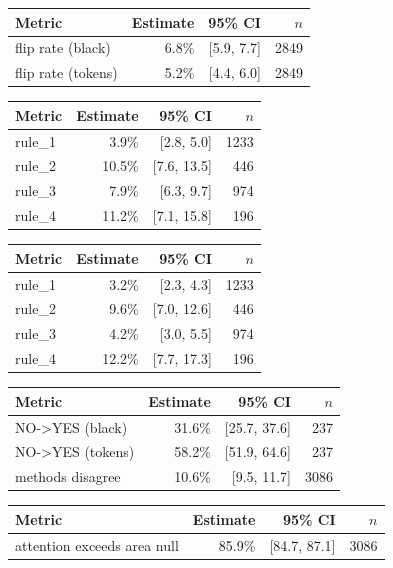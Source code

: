 \begin{tabular}{lrrr}
\toprule
Metric & Estimate & 95\% CI & $n$ \\
\midrule
flip rate (black) & 6.8\% & [5.9, 7.7] & 2849 \\
flip rate (tokens) & 5.2\% & [4.4, 6.0] & 2849 \\
\bottomrule
\end{tabular}

\begin{tabular}{lrrr}
\toprule
Metric & Estimate & 95\% CI & $n$ \\
\midrule
rule\_1 & 3.9\% & [2.8, 5.0] & 1233 \\
rule\_2 & 10.5\% & [7.6, 13.5] & 446 \\
rule\_3 & 7.9\% & [6.3, 9.7] & 974 \\
rule\_4 & 11.2\% & [7.1, 15.8] & 196 \\
\bottomrule
\end{tabular}

\begin{tabular}{lrrr}
\toprule
Metric & Estimate & 95\% CI & $n$ \\
\midrule
rule\_1 & 3.2\% & [2.3, 4.3] & 1233 \\
rule\_2 & 9.6\% & [7.0, 12.6] & 446 \\
rule\_3 & 4.2\% & [3.0, 5.5] & 974 \\
rule\_4 & 12.2\% & [7.7, 17.3] & 196 \\
\bottomrule
\end{tabular}

\begin{tabular}{lrrr}
\toprule
Metric & Estimate & 95\% CI & $n$ \\
\midrule
NO->YES (black) & 31.6\% & [25.7, 37.6] & 237 \\
NO->YES (tokens) & 58.2\% & [51.9, 64.6] & 237 \\
methods disagree & 10.6\% & [9.5, 11.7] & 3086 \\
\bottomrule
\end{tabular}

\begin{tabular}{lrrr}
\toprule
Metric & Estimate & 95\% CI & $n$ \\
\midrule
attention exceeds area null & 85.9\% & [84.7, 87.1] & 3086 \\
\bottomrule
\end{tabular}

